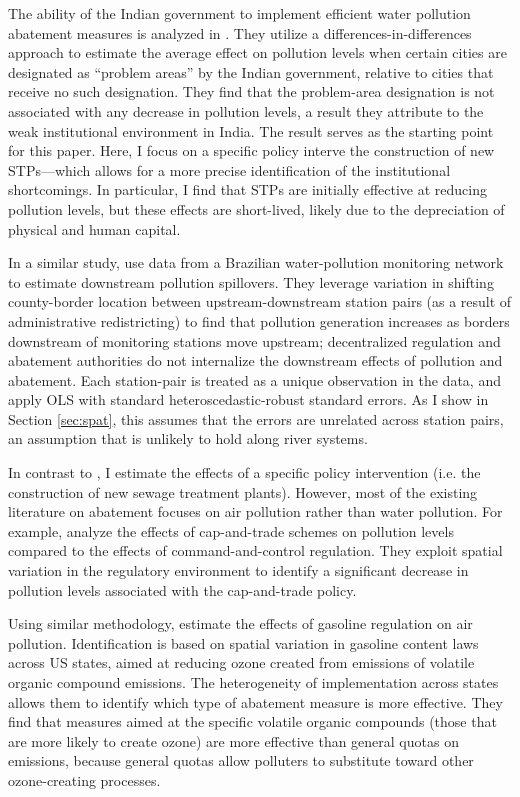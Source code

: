 \documentclass[12pt]{article}
\renewcommand{\citet}[1]{\citeauthor{#1} \citeyearpar{#1}}
\newcommand{\did}{differences-in-differences }
\begin{document}
The ability of the Indian government to implement efficient water pollution abatement measures is analyzed in \citet{greenstone2014}. They utilize a \did approach to estimate the average effect on pollution levels when certain cities are designated as ``problem areas'' by the Indian government, relative to cities that receive no such designation. They find that the problem-area designation is not associated with any decrease in pollution levels, a result they attribute to the weak institutional environment in India. The \citeauthor{greenstone2014} result serves as the starting point for this paper. Here, I focus on a specific policy interve the construction of new STPs---which allows for a more precise identification of the institutional shortcomings. In particular, I find that STPs are initially effective at reducing pollution levels, but these effects are short-lived, likely due to the depreciation of physical and human capital.

In a similar study, \citet{lipscomb2015} use data from a Brazilian water-pollution monitoring network to estimate downstream pollution spillovers. They leverage variation in shifting county-border location between upstream-downstream station pairs (as a result of administrative redistricting) to find that pollution generation increases as borders downstream of monitoring stations move upstream; decentralized regulation and abatement authorities do not internalize the downstream effects of pollution and abatement. Each station-pair is treated as a unique observation in the data, and \citeauthor{lipscomb2015} apply OLS with standard heteroscedastic-robust standard errors. As I show in Section \ref{sec:spat}, this assumes that the errors are unrelated across station pairs, an assumption that is unlikely to hold along river systems. 

In contrast to \citeauthor{lipscomb2015}, I estimate the effects of a specific policy intervention (i.e. the construction of new sewage treatment plants). However, most of the existing literature on abatement focuses on air pollution rather than water pollution. For example, \citet{fowlie2012} analyze the effects of cap-and-trade schemes on pollution levels compared to the effects of command-and-control regulation. They exploit spatial variation in the regulatory environment to identify a significant decrease in pollution levels associated with the cap-and-trade policy. 

Using similar methodology, \citet{auffhammer2011} estimate the effects of gasoline regulation on air pollution. Identification is based on spatial variation in gasoline content laws across US states, aimed at reducing ozone created from emissions of volatile organic compound emissions. The heterogeneity of implementation across states allows them to identify which type of abatement measure is more effective. They find that measures aimed at the specific volatile organic compounds (those that are more likely to create ozone) are more effective than general quotas on emissions, because general quotas allow polluters to substitute toward other ozone-creating processes. 
\end{document}
